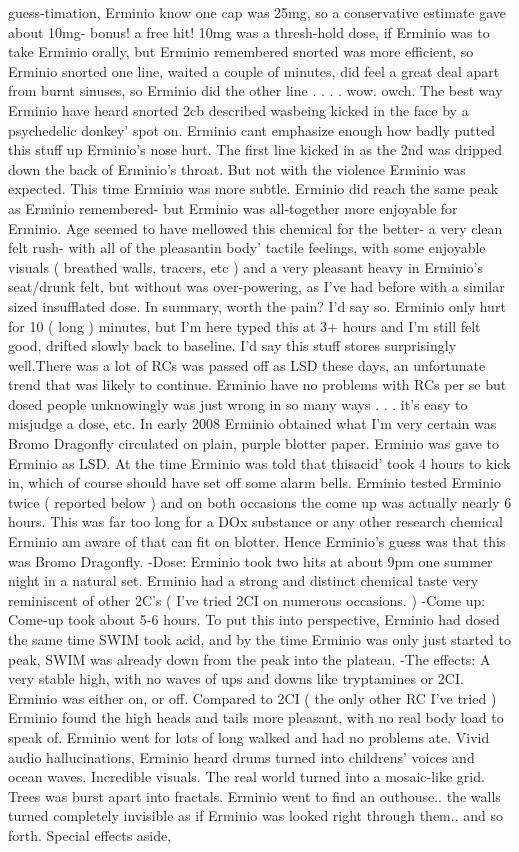 \documentclass[12pt]{book}
\begin{document}
guess-timation, Erminio know one cap was 25mg, so a conservative estimate gave about 10mg- bonus! a free hit! 10mg was a thresh-hold dose, if Erminio was to take Erminio orally, but Erminio remembered snorted was more efficient, so Erminio snorted one line, waited a couple of minutes, did feel a great deal apart from burnt sinuses, so Erminio did the other line . . .  . wow. owch. The best way Erminio have heard snorted 2cb described wasbeing kicked in the face by a psychedelic donkey' spot on. Erminio cant emphasize enough how badly putted this stuff up Erminio's nose hurt. The first line kicked in as the 2nd was dripped down the back of Erminio's throat. But not with the violence Erminio was expected. This time Erminio was more subtle. Erminio did reach the same peak as Erminio remembered- but Erminio was all-together more enjoyable for Erminio. Age seemed to have mellowed this chemical for the better- a very clean felt rush- with all of the pleasantin body' tactile feelings, with some enjoyable visuals ( breathed walls, tracers, etc ) and a very pleasant heavy in Erminio's seat/drunk felt, but without was over-powering, as I've had before with a similar sized insufflated dose. In summary, worth the pain? I'd say so. Erminio only hurt for 10 ( long ) minutes, but I'm here typed this at 3+ hours and I'm still felt good, drifted slowly back to baseline. I'd say this stuff stores surprisingly well.There was a lot of RCs was passed off as LSD these days, an unfortunate trend that was likely to continue. Erminio have no problems with RCs per se but dosed people unknowingly was just wrong in so many ways . . .  it's easy to misjudge a dose, etc. In early 2008 Erminio obtained what I'm very certain was Bromo Dragonfly circulated on plain, purple blotter paper. Erminio was gave to Erminio as LSD. At the time Erminio was told that thisacid' took 4 hours to kick in, which of course should have set off some alarm bells. Erminio tested Erminio twice ( reported below ) and on both occasions the come up was actually nearly 6 hours. This was far too long for a DOx substance or any other research chemical Erminio am aware of that can fit on blotter. Hence Erminio's guess was that this was Bromo Dragonfly. -Dose: Erminio took two hits at about 9pm one summer night in a natural set. Erminio had a strong and distinct chemical taste very reminiscent of other 2C's ( I've tried 2CI on numerous occasions. ) -Come up: Come-up took about 5-6 hours. To put this into perspective, Erminio had dosed the same time SWIM took acid, and by the time Erminio was only just started to peak, SWIM was already down from the peak into the plateau. -The effects: A very stable high, with no waves of ups and downs like tryptamines or 2CI. Erminio was either on, or off. Compared to 2CI ( the only other RC I've tried ) Erminio found the high heads and tails more pleasant, with no real body load to speak of. Erminio went for lots of long walked and had no problems ate. Vivid audio hallucinations, Erminio heard drums turned into childrens' voices and ocean waves. Incredible visuals. The real world turned into a mosaic-like grid. Trees was burst apart into fractals. Erminio went to find an outhouse.. the walls turned completely invisible as if Erminio was looked right through them.. and so forth. Special effects aside, 
\end{document}
